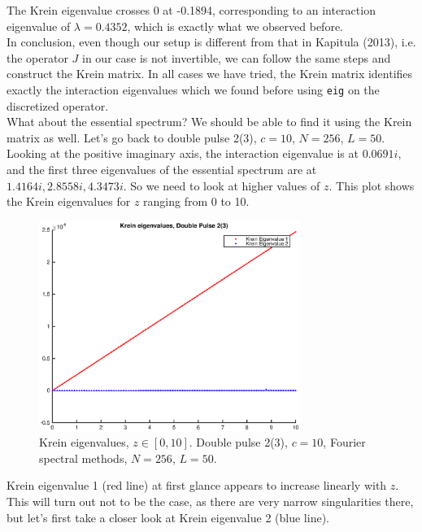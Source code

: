 \documentclass[12pt]{article}
\begin{document}
The Krein eigenvalue crosses 0 at -0.1894, corresponding to an interaction eigenvalue of $\lambda = 0.4352$, which is exactly what we observed before.\\

In conclusion, even though our setup is different from that in Kapitula (2013), i.e. the operator $J$ in our case is not invertible, we can follow the same steps and construct the Krein matrix. In all cases we have tried, the Krein matrix identifies exactly the interaction eigenvalues which we found before using \texttt{eig} on the discretized operator.\\

What about the essential spectrum? We should be able to find it using the Krein matrix as well. Let's go back to double pulse 2(3), $c = 10$, $N = 256$, $L = 50$. Looking at the positive imaginary axis, the interaction eigenvalue is at $0.0691i$, and the first three eigenvalues of the essential spectrum are at $1.4164i, 2.8558i, 4.3473i$. So we need to look at higher values of $z$. This plot shows the Krein eigenvalues for $z$ ranging from 0 to 10.

\begin{figure}[H]
	\includegraphics[width=8.5cm]{dp2kreineig3.eps}
	\caption{Krein eigenvalues, $z \in [0, 10]$. Double pulse 2(3), $c = 10$, Fourier spectral methods, $N =  256$, $L = 50$. }
\end{figure}

Krein eigenvalue 1 (red line) at first glance appears to increase linearly with $z$. This will turn out not to be the case, as there are very narrow singularities there, but let's first take a closer look at Krein eigenvalue 2 (blue line). 
\end{document}
